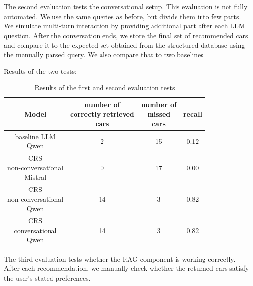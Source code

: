\documentclass[fleqn,moreauthors,10pt]{ds_report}
\begin{document}
The second evaluation tests the conversational setup. This evaluation 
is not fully automated. We use the same queries as before, but divide them 
into few parts. We simulate 
multi-turn interaction by providing additional part after each LLM question. 
After the conversation ends, we store the final set of recommended cars and 
compare it to the expected set obtained from the structured database using 
the manually parsed query. We also compare that to two baselines

\vspace{5pt}
\noindent
Results of the two tests:

\begin{table}[H]
\resizebox{1.0 \linewidth}{!}
{\begin{tabular}{| c | c c c |}

\hline
Model & \makecell{number of \\ correctly retrieved \\ cars} & \makecell{number of \\ missed \\ cars} & recall \\ \hline
\makecell{baseline LLM \\ Qwen}  &  2  & 15 & 0.12 \\
\hline
\makecell{CRS \\ non-conversational \\ Mistral}  &  0  & 17 & 0.00 \\
\hline
\makecell{CRS \\ non-conversational \\ Qwen}  &  14 & 3  & 0.82 \\
\hline
\makecell{CRS \\ conversational \\ Qwen}  &  14 & 3  & 0.82 \\
\hline

\end{tabular}}
\caption{
    Results of the first and second evaluation tests
}
\label{tab:CRS results}
\end{table}
\FloatBarrier



The third evaluation tests whether the RAG component is working correctly.
After each recommendation, we manually check whether the returned cars 
satisfy the user's stated preferences.
\end{document}
